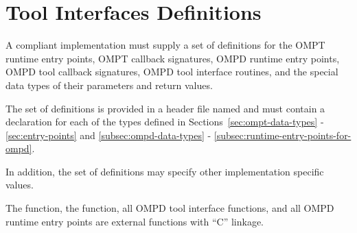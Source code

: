 \section{Tool Interfaces Definitions}
\label{sec:tool_interfaces_definitions}

\begin{ccppspecific}

A compliant implementation must supply a set of definitions for the OMPT runtime entry 
points, OMPT callback signatures, OMPD runtime entry points, OMPD tool callback 
signatures, OMPD tool interface routines, and the special data types of their parameters 
and return values.

The set of definitions is provided in a header file named  and must 
contain a declaration for each of the types defined in 
Sections~\ref{sec:ompt-data-types} - \ref{sec:entry-points} and
\ref{subsec:ompd-data-types} - \ref{subsec:runtime-entry-points-for-ompd}. 

In addition, the set of definitions may specify other implementation specific values.

The  function, the  function, all OMPD 
tool interface functions, and all OMPD runtime entry points are external functions with 
``C'' linkage.
	
			
\end{ccppspecific}











